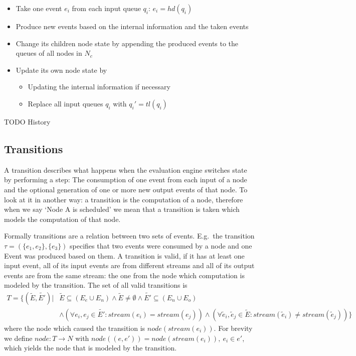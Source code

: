 \begin{itemize}
  \item Take one event \(e_i\) from each input queue \(q_i\): \(e_i = hd(q_i)\)
  \item Produce new events based on the internal information and the taken events
  \item Change its children node state by appending the produced events to the queues of all nodes in \(N_c\)
  \item Update its own node state by
  \begin{itemize}
    \item Updating the internal information if necessary
    \item Replace all input queues \(q_i\) with \(q_i' = tl(q_i)\)
  \end{itemize}
\end{itemize}

TODO History

\subsection{Transitions}
\label{sec:concepts:def:transitions}

A transition describes what happens when the evaluation engine switches state by performing a step:
The consumption of one event from each input of a node and the optional generation of one or more new output events of that node.
To look at it in another way: a transition is the computation of a node, therefore when we say `Node A is scheduled' we mean that a transition is taken which models the computation of that node.

Formally transitions are a relation between two sets of events.
E.g.\ the transition \(\tau = (\{e_1,e_2\}, \{e_3\})\) specifies that two events were consumed by a node and one Event was produced based on them.
A transition is valid, if it has at least one input event, all of its input events are from different streams and all of its output events are from the same stream: the one from the node which computation is modeled by the transition.
The set of all valid transitions is
\begin{align*}
  T = \{(\widetilde{E}, \widetilde{E'}) | &\widetilde{E} \subseteq (E_e \cup E_n) \land \widetilde{E} \neq \emptyset \land \widetilde{E'} \subseteq (E_n \cup E_o)\\
&\land (\forall e_i, e_j \in \widetilde{E'}: \mathit{stream}(e_i) = \mathit{stream}(e_j)) \land (\forall \widetilde{e}_i, \widetilde{e}_j \in \widetilde{E}: \mathit{stream}(\widetilde{e}_i) \neq \mathit{stream}(\widetilde{e}_j))\}
\end{align*}
where the node which caused the transition is \(\mathit{node}(\mathit{stream}(e_i))\).
For brevity we define \(\mathit{node} : T \rightarrow N\) with \(\mathit{node}((e, e')) = \mathit{node}(\mathit{stream}(e_i)),\ e_i \in e'\), which yields the node that is modeled by the transition.


